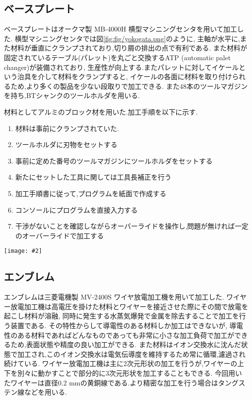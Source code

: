 \documentclass[uplatex,a4j,11pt,dvipdfmx]{jsreport}
\makeatletter
\def\fgcaption{\def\@captype{figure}\caption}
\newcommand{\mfig}[3][width=15cm]{
\begin{center}
\texttt{[image: \#2]}
\fgcaption{#3 \label{fig:#2}}
\end{center}
}
\makeatother
\begin{document}
  \subsection{ベースプレート}
  ベースプレートはオークマ製 MB-4000H 横型マシニングセンタを用いて加工した.
  横型マシニングセンタでは図\ref{fig:fig/yokogata.png}のように,
  主軸が水平に,また材料が垂直にクランプされており,切り屑の排出の点で有利である.
  また材料が固定されているテーブル(パレット)を丸ごと交換するATP (automatic palet changer)が装備されており,
  生産性が向上する.またパレットに対してイケールという治具を介して材料をクランプすると,
  イケールの各面に材料を取り付けられるため,より多くの製品を少ない段取りで加工できる.
  また48本のツールマガジンを持ち,BTシャンクのツールホルダを用いる.


  材料としてアルミのブロック材を用いた.加工手順を以下に示す.
  \begin{enumerate}
    \item 材料は事前にクランプされていた.
    \item ツールホルダに刃物をセットする
    \item 事前に定めた番号のツールマガジンにツールホルダをセットする
    \item 新たにセットした工具に関しては工具長補正を行う
    \item 加工手順書に従って,プログラムを紙面で作成する
    \item コンソールにプログラムを直接入力する
    \item 干渉がないことを確認しながらオーバーライドを操作し,問題が無ければ一定のオーバーライドで加工する
  \end{enumerate}
  \mfig[width=8cm]{fig/yokogata.png}{横型マシニングセンタの構成\cite{yokogata:online}}
  \subsection{エンブレム}
  エンブレムは三菱電機製 MV-2400S ワイヤ放電加工機を用いて加工した.
  ワイヤー放電加工機は高電圧を掛けた材料とワイヤーを接近させた際にその間で放電を起こし材料が溶融,
  同時に発生する水蒸気爆発で金属を除去することで加工を行う装置である.
  その特性からして導電性のある材料しか加工はできないが,
  導電性のある材料であればどんなものであっても非常に小さな加工負荷で加工ができるため,表面状態や精度の良い加工ができる.
  また材料はイオン交換水に沈んだ状態で加工され,このイオン交換水は電気伝導度を維持するため常に循環,濾過され続けている.
  ワイヤー放電加工機は主に2次元形状の加工を行うが,ワイヤーの上下を別々に動かすことで部分的に3次元形状を加工することもできる.
  今回用いたワイヤーは直径0.2 mmの黄銅線である.より精密な加工を行う場合はタングステン線などを用いる.
\end{document}
